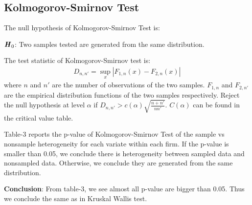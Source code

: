\documentclass[12pt,]{article}
\begin{document}
\subsection{Kolmogorov-Smirnov Test}
The null hypothesis of Kolmogorov-Smirnov Test is:
\begin{center}
$\textbf{\textit{H}}_0$: Two samples tested are generated from the same distribution.
\end{center}
The test statistic of Kolmogorov-Smirnov test is:
\begin{align}
D_{n, n'} = \sup_x |F_{1,n}(x) - F_{2,n}(x)|
\end{align}
where $n$ and $n'$ are the number of observations of the two samples. $F_{1,n}$ and $F_{2,n'}$ are the empirical distribution functions of the two samples respectively. Reject the null hypothesis at level $\alpha$ if $D_{n, n'} > c(\alpha) \sqrt{\frac{n + n'}{nn'}}$. $C(\alpha)$ can be found in the critical value table.

Table-3 reports the p-value of Kolmogorov-Smirnov Test of the sample vs nonsample heterogeneity for each variate within each firm. If the p-value is smaller than 0.05, we conclude there is heterogeneity between sampled data and nonsampled data. Otherwise, we conclude they are generated from the same distribution.

\textbf{Conclusion}: From table-3, we see almost all p-value are bigger than 0.05. Thus we conclude the same as in Kruskal Wallis test.
\end{document}
